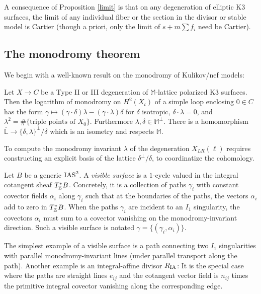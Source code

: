 \documentclass[table,x11names]{amsart}
\begin{document}
\begin{remark} A consequence of Proposition \ref{limit} is that
on any degeneration of elliptic K3 surfaces, the limit of any individual fiber or the section
in the divisor or stable model is Cartier
(though a priori, only the limit of $s+m\sum f_i$ need be Cartier).  \end{remark}
 
 \subsection{The monodromy theorem}
 \label{sec:monodromy-thm}
 
We begin with a well-known result on the monodromy of Kulikov/nef models:

\begin{theorem}\label{thm:fs} Let $X\to C$ be a Type II or III degeneration
of $\mathbb{M}$-lattice polarized K3 surfaces.
Then the logarithm of monodromy 
on $H^2(X_t)$ of a simple loop enclosing $0\in C$ has the form 
$\gamma\mapsto (\gamma \cdot \delta)\lambda -(\gamma\cdot \lambda)\delta$
for $\delta$ isotropic, $\delta\cdot \lambda=0$, and
$\lambda^2=\#\{\textrm{triple points of }X_0\}.$ Furthermore
$\lambda, \delta\in \mathbb{M}^\perp$.
There is a homomorphism $\overline{\mathbb{L}}\rightarrow \{\delta,\lambda\}^\perp/\delta$
which is an isometry and respects $\mathbb{M}$. \end{theorem}

To compute the monodromy invariant $\lambda$ of the degeneration $X_{LR}(\ell)$
requires constructing an explicit basis of the lattice $\delta^\perp/\delta$, to coordinatize
the cohomology.

\begin{definition} Let $B$ be a generic $\operatorname{IAS}^2$. A {\it visible surface} is a $1$-cycle valued in
the integral cotangent sheaf $T^*_{\mathbb{Z}} B$. Concretely, it is a collection of paths $\gamma_i$
with constant covector fields $\alpha_i$ along $\gamma_i$ such that at the boundaries of the
paths, the vectors $\alpha_i$ add to zero in $T^*_{\mathbb{Z}} B$. When the paths $\gamma_i$ are incident
to an $I_1$ singularity, the covectors $\alpha_i$ must sum to a covector vanishing on the
monodromy-invariant direction. Such a visible surface is notated $\gamma=\{(\gamma_i, \alpha_i)\}$.
 \end{definition}
 
 \begin{example}\label{ex:simple-vis} The simplest example of a
 visible surface is a path connecting two $I_1$ singularities
 with parallel monodromy-invariant lines (under parallel transport along the path). Another example
 is an integral-affine divisor $R_{{\rm IA}}$: It is the special case where the paths are straight lines $e_{ij}$
 and the cotangent vector field is $n_{ij}$ times the primitive integral
 covector vanishing along the corresponding edge. \end{example}
 
\end{document}
